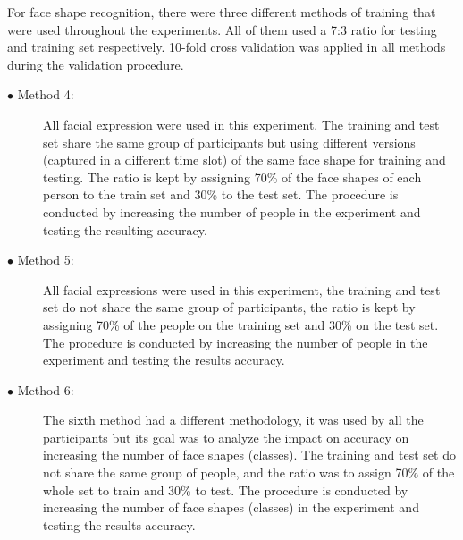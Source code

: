 \documentclass[]{article}
\begin{document}
For face shape recognition, there were three different methods of training that
were used throughout the experiments. All of them used a 7:3 ratio for testing 
and training set respectively. 10-fold cross validation was applied in all
methods during the validation procedure.

\begin{description}
\item[$\bullet$ Method 4:] All facial expression were used in this experiment.
The training and test set share the same group of participants but using
different  versions (captured in a different time slot) of the same face shape
for training and testing. The ratio is kept by assigning 70\% of the face shapes
of each person to the train set and 30\% to the test set. The procedure is conducted
by increasing the number of people in the experiment and testing the resulting
accuracy.
\item[$\bullet$ Method 5:] All facial expressions were used in this experiment,
the training and test set do not  share the same group of participants, the
ratio is kept by assigning 70\% of the people on the training set and 30\% on the
test set. The procedure is conducted by increasing the number of people in the
experiment and testing the results accuracy.
\item[$\bullet$ Method 6:] The sixth method had a different methodology, it was
used by all the participants but its goal was to analyze the impact on accuracy
on increasing the number of face shapes (classes).  The training and test set do
not share the same group of people, and the ratio was to assign 70\% of the whole set to
train and 30\% to test. The procedure is conducted by increasing the number of
face shapes (classes) in the experiment and testing the results accuracy.
\end{description}
\end{document}
